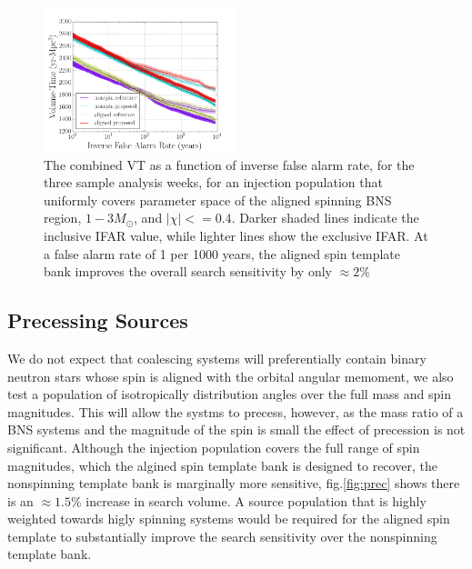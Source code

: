 \begin{figure}
\centering
\includegraphics[width=0.5\textwidth]{papers/bns_o1_dev/figures/aligned_combined.png}
\caption{\label{fig:aligned} 
The combined VT as a function of inverse false alarm rate, for the
three sample analysis weeks, for an injection population that uniformly covers parameter space of the aligned spinning BNS region, $1- 3M_\odot$, and $|\chi| <= 0.4$. Darker shaded lines indicate the inclusive IFAR value, while lighter lines show the exclusive IFAR. At a false alarm rate of 1 per 1000 years, the aligned spin template bank improves the overall search sensitivity by only $\approx 2\%$
}
\end{figure}

\subsection{Precessing Sources}

We do not expect that coalescing systems will preferentially contain binary neutron stars whose spin is aligned with the orbital angular memoment, we also test a population of isotropically distribution angles over the full mass and spin magnitudes. This will allow the systms to precess, however, as the mass ratio of a BNS systems and the magnitude of the spin is small the effect of precession is not significant. Although the injection population covers the full range of spin magnitudes, which the algined spin template bank is designed to recover, the nonspinning template bank is marginally more sensitive,  fig.\ref{fig:prec} shows there is an $\approx 1.5\%$ increase in search volume. A source population that is highly weighted towards higly spinning systems would be required for the aligned spin template to substantially improve the search sensitivity over the nonspinning template bank. 

